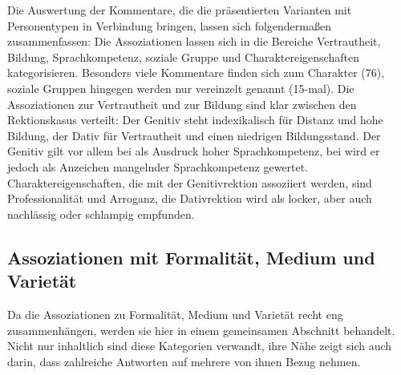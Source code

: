 Die Auswertung der Kommentare, die die präsentierten Varianten mit Personentypen in Verbindung bringen, lassen sich folgendermaßen zusammenfassen: 
Die Assoziationen lassen sich in die Bereiche \glqq Vertrautheit\grqq, \glqq Bildung\grqq, \glqq Sprachkompetenz\grqq, \glqq soziale Gruppe\grqq{} und \glqq Charaktereigenschaften\grqq{} kategorisieren. 
Besonders viele Kommentare finden sich zum Charakter (76), soziale Gruppen hingegen werden nur vereinzelt genannt (15-mal). 
Die Assoziationen zur Vertrautheit und zur Bildung sind klar zwischen den Rektionskasus verteilt: 
Der Genitiv steht indexikalisch für Distanz und hohe Bildung, der Dativ für Vertrautheit und einen niedrigen Bildungsstand. 
Der Genitiv gilt vor allem bei \waehrend{} als Ausdruck hoher Sprachkompetenz, bei \gegenueber{} wird er jedoch als Anzeichen mangelnder Sprachkompetenz gewertet. 
Charaktereigenschaften, die mit der Genitivrektion assoziiert werden, sind Professionalität und Arroganz, die Dativrektion wird als locker, aber auch nachlässig oder schlampig empfunden.
\subsection{Assoziationen mit Formalität, Medium und Varietät}
\label{sec:ErgAssFormMedVar}
Da die Assoziationen zu Formalität, Medium und Varietät recht eng zusammenhängen, werden sie hier in einem gemeinsamen Abschnitt behandelt. 
Nicht nur inhaltlich sind diese Kategorien verwandt, ihre Nähe zeigt sich auch darin, dass zahlreiche Antworten auf mehrere von ihnen Bezug nehmen. 

